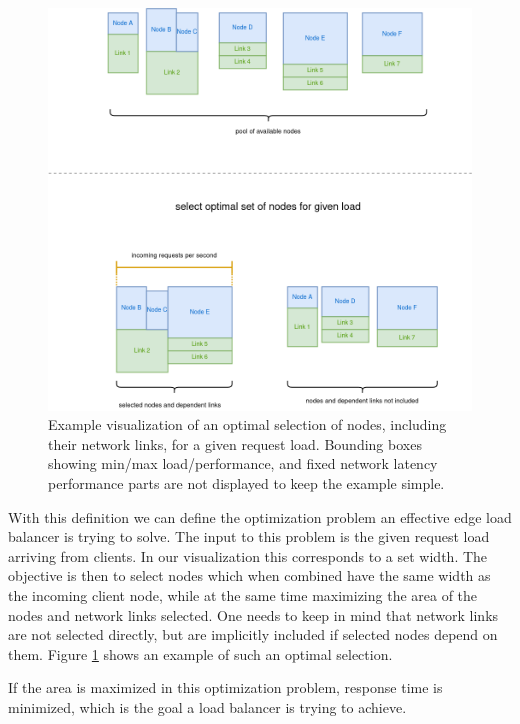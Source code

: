 \begin{figure}
    \centering
    \includegraphics[width=14cm]{graphics/diagrams/lb_optimal_selection.png}
    \caption{Example visualization of an optimal selection of nodes, including their network links, for a given request load. Bounding boxes showing min/max load/performance, and fixed network latency performance parts are not displayed to keep the example simple.}
    \label{fig:lb_optimal_load}
\end{figure}

With this definition we can define the optimization problem an effective edge load balancer is trying to solve. The input to this problem is the given request load arriving from clients. In our visualization this corresponds to a set width. The objective is then to select nodes which when combined have the same width as the incoming client node, while at the same time maximizing the area of the nodes and network links selected. One needs to keep in mind that network links are not selected directly, but are implicitly included if selected nodes depend on them. Figure \ref{fig:lb_optimal_load} shows an example of such an optimal selection.

If the area is maximized in this optimization problem, response time is minimized, which is the goal a load balancer is trying to achieve.


